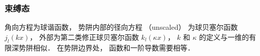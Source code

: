 
\begin{issues}
\issueDraft
\end{issues}


\subsubsection{束缚态}

角向方程为球谐函数， 势阱内部的径向方程 （unscaled） 为球贝塞尔函数 $j_l(kx)$，  外部为第二类修正球贝塞尔函数 $k_l(\kappa x)$，   $k$ 和 $\kappa $ 的定义与一维的有限深势阱相似． 在势阱边界处， 函数和一阶导数需要相等． 
